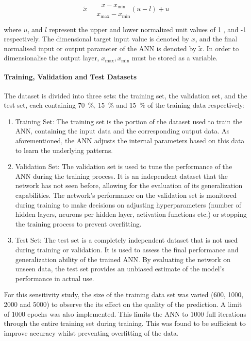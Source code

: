 \begin{equation}
	\tilde{x}=\frac{x-x_{\min }}{x_{\max }-x_{\min }}(u-l)+u
\end{equation}

where $u$, and $l$ represent the upper and lower normalized unit values of 1 , and -1 respectively. The dimensional target input value is denoted by $x$, and the final normalised input or output parameter of the ANN is denoted by $\tilde{x}$. In order to dimensionalise the output layer, $x_{\max }, x_{\min }$ must be stored as a variable.

\paragraph{Training, Validation and Test Datasets}

The dataset is divided into three sets: the training set, the validation set, and the test set, each containing 70~$\%$, 15~$\%$ and 15~$\%$ of the training data respectively:

\begin{enumerate}
	\item Training Set: The training set is the portion of the dataset used to train the ANN, containing the input data and the corresponding output data. As aforementioned, the ANN adjusts the internal parameters based on this data to learn the underlying patterns.
	\item Validation Set: The validation set is used to tune the performance of the ANN during the training process. It is an independent dataset that the network has not seen before, allowing for the evaluation of its generalization capabilities. The network's performance on the validation set is monitored during training to make decisions on adjusting hyperparameters (number of hidden layers, neurons per hidden layer, activation functions etc.) or stopping the training process to prevent overfitting.
	\item Test Set: The test set is a completely independent dataset that is not used during training or validation. It is used to assess the final performance and generalization ability of the trained ANN. By evaluating the network on unseen data, the test set provides an unbiased estimate of the model's performance in actual use.
\end{enumerate}

For this sensitivity study, the size of the training data set was varied (600, 1000, 2000 and 5000) to observe the its effect on the quality of the prediction. A limit of 1000 epochs was also implemented. This limits the ANN to 1000 full iterations through the entire training set during training. This was found to be sufficient to improve accuracy whilst preventing overfitting of the data.

